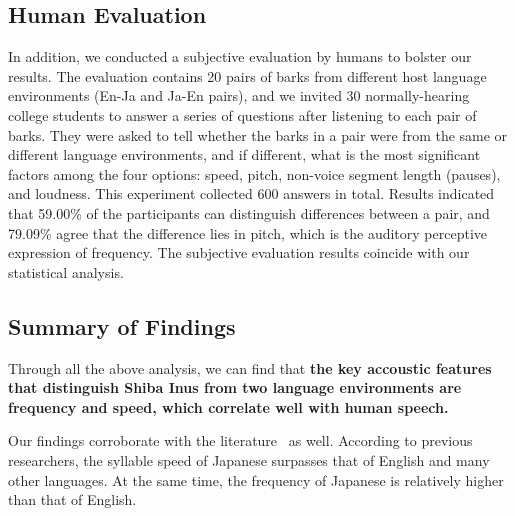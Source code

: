 \subsection{Human Evaluation}
In addition, we conducted a subjective evaluation by humans to bolster our results. The evaluation contains 20 pairs of barks from different host language environments (En-Ja and Ja-En pairs), and we invited 30 normally-hearing college students to answer a series of questions after listening to each pair of barks. 
They were asked to tell whether the barks in a pair were from the same or different language environments, 
and if different, what is the most significant factors among the four options: speed, pitch, 
non-voice segment length (pauses), and loudness. 
This experiment collected 600 answers in total. Results indicated that 59.00\% 
of the participants can distinguish differences between a pair, and 79.09\% agree that 
the difference lies in pitch, which is the auditory perceptive expression of frequency. 
The subjective evaluation results coincide with our statistical analysis. 


\subsection{Summary of Findings}

Through all the above analysis, we can find that \textbf{the key accoustic features that distinguish Shiba Inus from two language environments are frequency and speed, which correlate well with human speech.}





Our findings corroborate with the literature~\cite{doi:10.1126/sciadv.aaw2594, graham2014fundamental} as well. According to previous researchers, the syllable speed of Japanese surpasses that of English and many other languages. At the same time, the frequency of Japanese is relatively higher than that of English.


